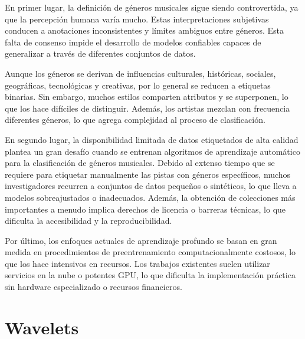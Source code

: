 \documentclass[colorinlistoftodos,twoside,twocolumn,10pt]{article} %
\begin{document}
En primer lugar, la definición de géneros musicales sigue siendo controvertida, ya que la percepción humana varía mucho. Estas interpretaciones subjetivas conducen a anotaciones inconsistentes  y límites ambiguos entre géneros. Esta falta de consenso impide el desarrollo de modelos confiables capaces de generalizar a través de diferentes conjuntos de datos.

Aunque los géneros se derivan de influencias culturales, históricas, sociales, geográficas, tecnológicas y creativas, por lo general se reducen a etiquetas binarias. Sin embargo, muchos estilos comparten atributos y se superponen, lo que los hace difíciles de distinguir. Además, los artistas mezclan con frecuencia diferentes géneros, lo que agrega complejidad al proceso de clasificación.

En segundo lugar, la disponibilidad limitada de datos etiquetados de alta calidad plantea un gran desafío cuando se entrenan algoritmos de aprendizaje automático para la clasificación de géneros musicales. Debido al extenso tiempo que se requiere para etiquetar manualmente las pistas con géneros específicos, muchos investigadores recurren a conjuntos de datos pequeños o sintéticos, lo que lleva a modelos sobreajustados o inadecuados. Además, la obtención de colecciones más importantes a menudo implica derechos de licencia o barreras técnicas, lo que dificulta la accesibilidad y la reproducibilidad.

Por último, los enfoques actuales de aprendizaje profundo se basan en gran medida en procedimientos de preentrenamiento computacionalmente costosos, lo que los hace intensivos en recursos. Los trabajos existentes suelen utilizar servicios en la nube o potentes GPU, lo que dificulta la implementación práctica sin hardware especializado o recursos financieros. 
	  

	\section{Wavelets}
\end{document}
